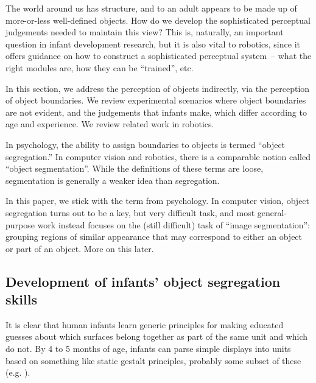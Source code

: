 
The world around us has structure, and to an adult appears to be made
up of more-or-less well-defined objects.  How do we develop the
sophisticated perceptual judgements needed to maintain this view?
This is, naturally, an important question in infant development research,
but it is also vital to robotics, since it offers guidance on how
to construct a sophisticated perceptual system~-- what the right
modules are, how they can be ``trained'', etc.

In this section, we address the perception of objects indirectly, via
the perception of object boundaries.  We review experimental scenarios
where object boundaries are not evident, and the judgements that
infants make, which differ according to age and experience.  We review
related work in robotics.  

In psychology, the ability to assign boundaries to objects is termed
``object segregation.''  In computer vision and robotics, there
is a  comparable notion called ``object segmentation''.
While the definitions of these terms are loose, segmentation is
generally a weaker idea than segregation.

In this paper, we
stick with the term from psychology.  In computer vision, object
segregation turns out to be a key, but very difficult task, and most
general-purpose work instead focuses on the (still difficult) task of
``image segmentation'': grouping regions of similar appearance that
may correspond to either an object or part of an object.
%
More on this later.
%
%
%




\subsection{Development of infants' object segregation skills}

It is clear that human infants learn generic principles for making
educated guesses about which surfaces belong together as part of the
same unit and which do not.  By 4 to 5 months of age, infants can
parse simple displays into units based on something like static
gestalt principles, probably some subset of these (e.g. ).

